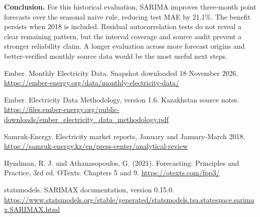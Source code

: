\documentclass[11pt,a4paper]{article}
\begin{document}
\textbf{Conclusion.} For this historical evaluation, SARIMA improves three-month point forecasts over the seasonal naive rule, reducing test MAE by 21.1\%. The benefit persists when 2018 is included. Residual autocorrelation tests do not reveal a clear remaining pattern, but the interval coverage and source audit prevent a stronger reliability claim. A longer evaluation across more forecast origins and better-verified monthly source data would be the most useful next steps.\par

\par{}\par\vspace{2pt}

{\fontsize{9}{11.3}\selectfont [1] Ember. Monthly Electricity Data. Snapshot downloaded 18 November 2026. \newline\url{https://ember-energy.org/data/monthly-electricity-data/}\par}

{\fontsize{9}{11.3}\selectfont [2] Ember. Electricity Data Methodology, version 1.6. Kazakhstan source notes. \newline\url{https://files.ember-energy.org/public-downloads/ember_electricity_data_methodology.pdf}\par}

{\fontsize{9}{11.3}\selectfont [3] Samruk-Energy. Electricity market reports, January and January-March 2018. \newline\url{https://samruk-energy.kz/en/press-center/analytical-review}\par}

{\fontsize{9}{11.3}\selectfont [4] Hyndman, R. J. and Athanasopoulos, G. (2021). Forecasting: Principles and Practice, 3rd ed. OTexts. Chapters 5 and 9. \newline\url{https://otexts.com/fpp3/}\par}

{\fontsize{9}{11.3}\selectfont [5] statsmodels. SARIMAX documentation, version 0.15.0. \newline\url{https://www.statsmodels.org/stable/generated/statsmodels.tsa.statespace.sarimax.SARIMAX.html}\par}
\end{document}

